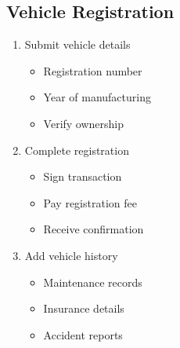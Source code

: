 \documentclass[12pt,a4paper]{article}
\begin{document}
    \subsection{Vehicle Registration}
    \begin{enumerate}
        \item Submit vehicle details
        \begin{itemize}
            \item Registration number
            \item Year of manufacturing
            \item Verify ownership
        \end{itemize}

        \item Complete registration
        \begin{itemize}
            \item Sign transaction
            \item Pay registration fee
            \item Receive confirmation
        \end{itemize}

        \item Add vehicle history
        \begin{itemize}
            \item Maintenance records
            \item Insurance details
            \item Accident reports
        \end{itemize}
    \end{enumerate}
\end{document}
